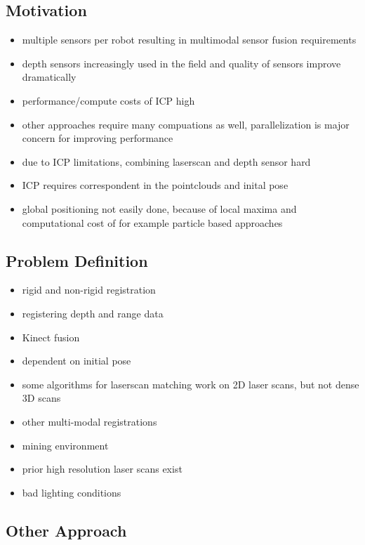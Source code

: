 \subsection{Motivation}

\begin{itemize}
    \item multiple sensors per robot resulting in multimodal sensor fusion requirements
    \item depth sensors increasingly used in the field and quality of sensors improve dramatically
    \item performance/compute costs of ICP high
    \item other approaches require many compuations as well, parallelization is major concern for improving performance
    \item due to ICP limitations, combining laserscan and depth sensor hard
    \item ICP requires correspondent in the pointclouds and inital pose
    \item global positioning not easily done, because of local maxima and computational cost of for example particle based approaches
\end{itemize}

\subsection{Problem Definition}

\begin{itemize}
    \item rigid and non-rigid registration
    \item registering depth and range data
    \item Kinect fusion
    \item dependent on initial pose
    \item some algorithms for laserscan matching work on 2D laser scans, but not dense 3D scans
    \item other multi-modal registrations
    \item mining environment
    \item prior high resolution laser scans exist
    \item bad lighting conditions
\end{itemize}

\subsection{Other Approach}

